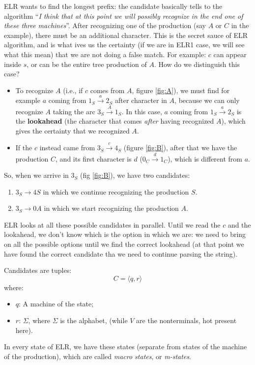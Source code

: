			ELR wants to find the longest prefix: the candidate basically tells to the algorithm ``\emph{I think that at this point we will possibly recognize in
			the end one of these three machines}''. After recognizing one of the production (say $A$ or $C$ in the example), there must be an additional character.
			This is the secret sauce of ELR algorithm, and is what ives us the certainty (if we are in ELR1 case, we will see what this mean) that we are not 
			doing a false match. For example: $c$ can appear inside $s$, or can be the entire tree production of $A$. How do we distinguish this case?
			\begin{itemize}
				\item To recognize $A$ (i.e., if $c$ comes from $A$, figure \ref{fig:A}), we must find for example $a$ coming from 
				$1_S\overset{a}{\longrightarrow}2_S$ after character in $A$, because we can 
				only recognize $A$ taking the arc $3_S\overset{A}{\longrightarrow}1_S$. In this case, $a$ coming from $1_S\overset{a}{\longrightarrow}2_S$ is the 
				\textbf{lookahead} (the character that comes \emph{after} having recognized $A$), which gives the certainty that we recognized $A$.
				\item If the $c$ instead came from $3_S\overset{c}{\longrightarrow}4_S$ (figure \ref{fig:B}), after that we have the production $C$, and its first 
				character is $d$ ($0_C\overset{d}{\longrightarrow}1_C$), which is different from $a$.
			\end{itemize}
			So, when we arrive in $3_S$ (fig \ref{fig:B}), we have two candidates:
			\begin{enumerate}
				\item $3_S\longrightarrow 4S$ in which we continue recognizing the production $S$.
				\item $3_S\longrightarrow 0A$ in which we start recognizing the production $A$.
			\end{enumerate}
			ELR looks at all these possible candidates in parallel. Until we read the $c$ and the lookahead, we don't know which is the option in which we are: 
			we need to bring on all the possible options until we find the correct lookahead (at that point we have found the correct candidate tha we need to 
			continue parsing the string).

			Candidates are tuples:
			\begin{equation*}
				C=\langle q,r\rangle
			\end{equation*}
			where:
			\begin{itemize}
				\item $q$: A machine of the state;
				\item $r$: $\Sigma$, where $\Sigma$ is the alphabet, (while $V$ are the nonterminals, hot present here).
			\end{itemize}
			In every state of ELR, we have these states (separate from states of the machine of the production), which are called \emph{macro states}, or 
			\emph{m-states}.
			
